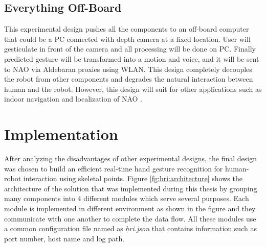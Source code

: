 

\subsection{Everything Off-Board} This experimental design pushes all the components to an off-board computer that could be a PC connected with depth camera at a fixed location. User will gesticulate in front of the camera and all processing will be done on PC. Finally predicted gesture will be transformed into a motion and voice, and it will be sent to NAO via Aldebaran proxies using WLAN. This design completely decouples the robot from other components and degrades the natural interaction between human and the robot. However, this design will suit for other applications such as indoor navigation and localization of NAO \cite{20}.

\section{Implementation} \label{sec:sol:impl} After analyzing the disadvantages of other experimental designs, the final design was chosen to build an efficient real-time hand gesture recognition for human-robot interaction using skeletal points. Figure \ref{fg:hri:architecture} shows the architecture of the solution that was implemented during this thesis by grouping many components into 4 different modules which serve several purposes. Each module is implemented in different environment as shown in the figure and they communicate with one another to complete the data flow. All these modules use a common configuration file named as \textit{hri.json} that contains information such as port number, host name and log path.





% 
%
%
%
%
%
%
%
